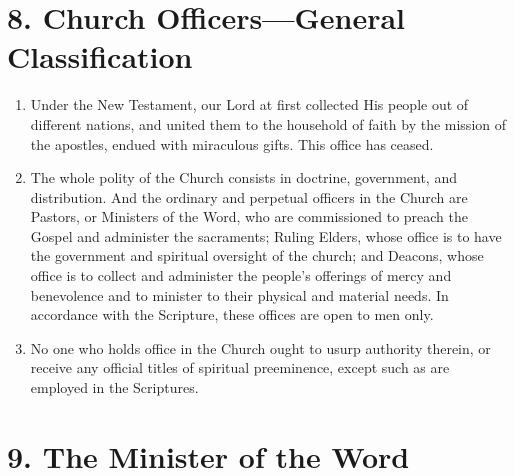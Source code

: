 \documentclass[
]{book}
\providecommand{\tightlist}{%
  \setlength{\itemsep}{0pt}\setlength{\parskip}{0pt}}
\begin{document}
\hypertarget{church-officersgeneral-classification}{%
\section*{8. Church Officers---General Classification}\label{church-officersgeneral-classification}}

\protect\hypertarget{chapter-slug-8-church-officers-general-classification}{\href{}{}}

\begin{enumerate}
\def\labelenumi{\arabic{enumi}.}
\tightlist
\item
  \protect\hypertarget{8}{\href{}{}}Under the New Testament, our Lord at first collected His people out of different nations, and united them to the household of faith by the mission of the apostles, endued with miraculous gifts. This office has ceased.
\item
  The whole polity of the Church consists in doctrine, government, and distribution. And the ordinary and perpetual officers in the Church are Pastors, or Ministers of the Word, who are commissioned to preach the Gospel and administer the sacraments; Ruling Elders, whose office is to have the government and spiritual oversight of the church; and Deacons, whose office is to collect and administer the people's offerings of mercy and benevolence and to minister to their physical and material needs. In accordance with the Scripture, these offices are open to men only.
\item
  No one who holds office in the Church ought to usurp authority therein, or receive any official titles of spiritual preeminence, except such as are employed in the Scriptures.
\end{enumerate}

\hypertarget{the-minister-of-the-word}{%
\section*{9. The Minister of the Word}\label{the-minister-of-the-word}}

\protect\hypertarget{chapter-slug-9-the-minister-of-the-word}{\href{}{}}
\end{document}
